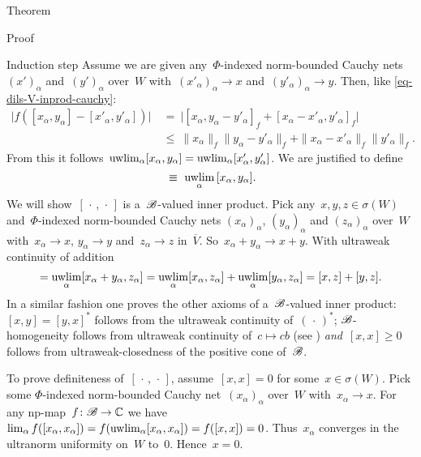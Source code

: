 \documentclass[b]{subfiles}
\begin{document}
\begin{parsec}
\begin{point}{Theorem}
\begin{point}{Proof}
\begin{point}{Induction step}
Assume we are given any~$\Phi$-indexed
norm-bounded Cauchy nets~$(x')_\alpha$ and~$(y')_\alpha$ over~$W$
with~$ (x'_\alpha)_\alpha \to x$
and~$ (y'_\alpha)_\alpha \to y$.
Then, like \eqref{eq-dils-V-inprod-cauchy}:
\begin{align*}
    \bigl|f([x_\alpha, y_\alpha] - [x'_\alpha,y'_\alpha])\bigr|
    & \ =\  \bigl| [x_\alpha, y_\alpha - y'_\alpha]_f
        + [x_\alpha - x'_\alpha, y'_\alpha]_f\bigr| \\
    &\  \leq\  \|x_\alpha\|_f \|y_\alpha - y'_\alpha\|_f
        + \|x_\alpha - x'_\alpha\|_f \| y'_\alpha \|_f.
\end{align*}
From this it follows~$ \uwlim_\alpha [x_\alpha,y_\alpha]=
    \uwlim_\alpha [x'_\alpha,y'_\alpha]$.
We are justified to define
\begin{equation*}
    [x,y] \ \equiv\  \uwlim_{\alpha} \,[x_\alpha,y_\alpha].
\end{equation*}
We will show~$[\,\cdot\,,\,\cdot\,]$ is a~$\mathscr{B}$-valued inner product.
Pick any~$x,y,z \in \sigma(W)$
    and~$\Phi$-indexed
norm-bounded Cauchy nets
$(x_\alpha)_\alpha$, $(y_\alpha)_\alpha$ and $(z_\alpha)_\alpha$ over~$W$
with~$x_\alpha \to x$, $y_\alpha \to y$ and~$z_\alpha \to z$ in~$\overline{V}$.
So~$x_\alpha+ y_\alpha \to x + y.$
With ultraweak continuity of addition
\begin{equation*}
    [x+y,z] = \uwlim_\alpha [x_\alpha +y_\alpha, z_\alpha]
        = \uwlim_\alpha [x_\alpha, z_\alpha] +
                \uwlim_\alpha [y_\alpha, z_\alpha]
                = [x,z] + [y,z].
\end{equation*}
In a similar fashion one proves the other axioms of
    a~$\mathscr{B}$-valued inner product:
    $[x,y]=[y,x]^*$ follows from the ultraweak continuity of~$(\,\cdot\,)^*$;
    $\mathscr{B}$-homogeneity follows from
        ultraweak continuity of~$c \mapsto cb$ (see )
        \emph{and}~$[x,x]\geq 0$ follows from ultraweak-closedness of the
        positive cone of~$\mathscr{B}$.

        To prove definiteness of~$[\,\cdot\,,\,\cdot\,]$, assume~$[x,x]=0$
            for some~$x \in \sigma(W)$.
    Pick some $\Phi$-indexed norm-bounded
        Cauchy net~$(x_\alpha)_\alpha$ over~$W$
        with~$x_\alpha \to x$.
For any np-map~$f\colon \mathscr{B} \to \mathbb{C}$
we have~$\lim_\alpha f([x_\alpha,x_\alpha])
         = f(\uwlim_\alpha [x_\alpha,x_\alpha])
         = f([x,x])  =  0$.
Thus~$x_\alpha$ converges in the ultranorm uniformity on~$W$ to~$0$.
Hence~$x=0$.


\end{point}
\end{point}
\end{point}
\end{parsec}
\end{document}
